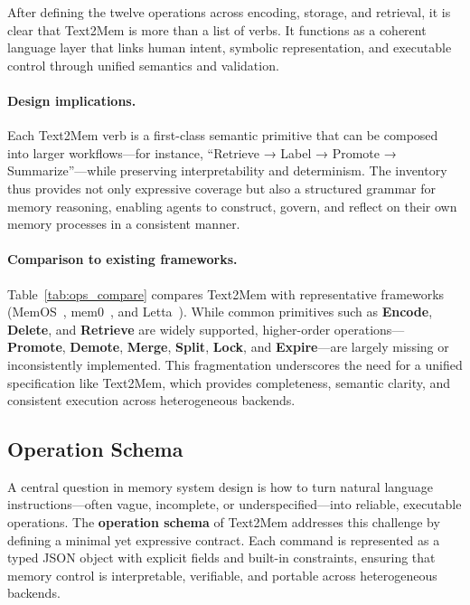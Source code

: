 \documentclass[conference]{IEEEtran}
\begin{document}
After defining the twelve operations across encoding, storage, and retrieval, it is clear that Text2Mem is more than a list of verbs.  
It functions as a coherent language layer that links human intent, symbolic representation, and executable control through unified semantics and validation.  

\paragraph{Design implications.}
Each Text2Mem verb is a first-class semantic primitive that can be composed into larger workflows—for instance, “Retrieve → Label → Promote → Summarize”—while preserving interpretability and determinism.  
The inventory thus provides not only expressive coverage but also a structured grammar for memory reasoning, enabling agents to construct, govern, and reflect on their own memory processes in a consistent manner.  

\paragraph{Comparison to existing frameworks.}
Table~\ref{tab:ops_compare} compares Text2Mem with representative frameworks (MemOS~\cite{li2025memos}, mem0~\cite{Chhikara2025Mem0}, and Letta~\cite{Packer2024MemGPT}).  
While common primitives such as \textbf{Encode}, \textbf{Delete}, and \textbf{Retrieve} are widely supported, higher-order operations—\textbf{Promote}, \textbf{Demote}, \textbf{Merge}, \textbf{Split}, \textbf{Lock}, and \textbf{Expire}—are largely missing or inconsistently implemented.  
This fragmentation underscores the need for a unified specification like Text2Mem, which provides completeness, semantic clarity, and consistent execution across heterogeneous backends.

\subsection{Operation Schema}
\label{subsec:schema}

A central question in memory system design is how to turn natural language instructions—often vague, incomplete, or underspecified—into reliable, executable operations.  
The \textbf{operation schema} of Text2Mem addresses this challenge by defining a minimal yet expressive contract.  
Each command is represented as a typed JSON object with explicit fields and built-in constraints, ensuring that memory control is interpretable, verifiable, and portable across heterogeneous backends.
\end{document}
